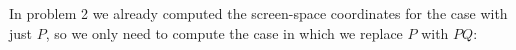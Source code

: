 \documentclass[11pt]{tingpset}
\begin{document}


  \newpage
    In problem 2 we already computed the screen-space coordinates for the case with just $P$, so we only need to compute the case in which we replace $P$ with $PQ$:
\end{document}
